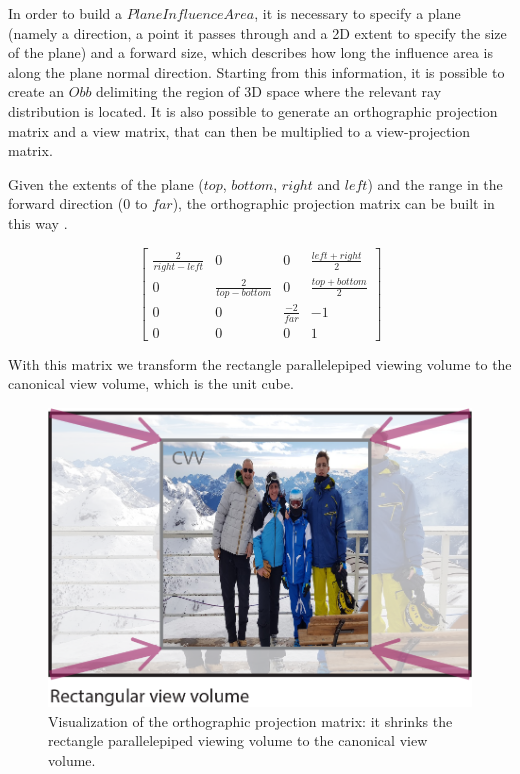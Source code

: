 \documentclass{PoliMi_MasterThesis}
\begin{document}
In order to build a $PlaneInfluenceArea$, it is necessary to specify a plane (namely a direction, a point it passes through and a 2D extent to specify the size of the plane) and a forward size, which describes how long the influence area is along the plane normal direction. Starting from this information, it is possible to create an $Obb$ delimiting the region of 3D space where the relevant ray distribution is located. It is also possible to generate an orthographic projection matrix and a view matrix, that can then be multiplied to a view-projection matrix.

Given the extents of the plane ($top$, $bottom$, $right$ and $left$) and the range in the forward direction ($0$ to $far$), the orthographic projection matrix can be built in this way \cite{TODO}.

\begin{equation}
	\begin{bmatrix}
		\frac{2}{right - left} & 0 & 0 & \frac{left + right}{2} \\
		0 & \frac{2}{top - bottom} & 0 & \frac{top + bottom}{2} \\
		0 & 0 & \frac{-2}{far} & -1 \\
		0 & 0 & 0 & 1
	\end{bmatrix}
\end{equation}

With this matrix we transform the rectangle parallelepiped viewing volume to the canonical view volume, which is the unit cube.

\begin{figure}[H]
    \centering
    \includegraphics[width=\textwidth*\real{0.6}]{Images/cvv.png}
    \caption{Visualization of the orthographic projection matrix: it shrinks the rectangle parallelepiped viewing volume to the canonical view volume.}
    \label{fig:canonical_view_volume}
\end{figure}
\end{document}
